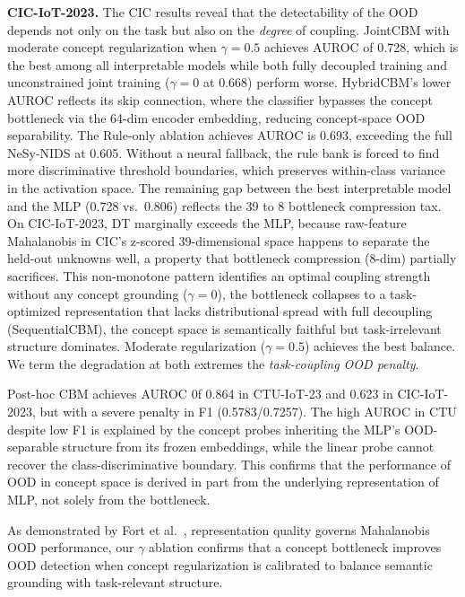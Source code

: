 \documentclass[journal]{IEEEtran}
\begin{document}
\textbf{CIC-IoT-2023.}
The CIC results reveal that the detectability of the OOD depends not only on the task but also on the \emph{degree} of coupling. JointCBM with moderate concept regularization when $\gamma{=}0.5$ achieves AUROC of 0.728, which is the best among all interpretable models while both fully decoupled training and unconstrained joint training ($\gamma{=}0$ at 0.668) perform worse.  HybridCBM's lower AUROC  reflects its skip connection, where the classifier bypasses the concept bottleneck via the 64-dim encoder embedding, reducing concept-space OOD separability. The Rule-only ablation achieves AUROC is 0.693, exceeding the full NeSy-NIDS at 0.605. Without a neural fallback, the rule bank is forced to find more discriminative threshold boundaries, which preserves within-class variance in the activation space. The remaining gap between the best interpretable model and the MLP (0.728 vs.\ 0.806) reflects the 39 to 8 bottleneck compression tax. On CIC-IoT-2023, DT marginally exceeds the MLP, because raw-feature Mahalanobis in CIC's z-scored 39-dimensional space happens to separate the held-out unknowns well, a property that bottleneck compression (8-dim) partially sacrifices. This non-monotone pattern identifies an optimal coupling strength without any concept grounding ($\gamma{=}0$), the bottleneck collapses to a task-optimized representation that lacks distributional spread with full decoupling (SequentialCBM), the concept space is semantically faithful but task-irrelevant structure dominates. Moderate
regularization ($\gamma{=}0.5$) achieves the best balance. We term the degradation at both extremes the \emph{task-coupling OOD penalty}.

Post-hoc CBM achieves AUROC 0f 0.864 in CTU-IoT-23 and 0.623 in CIC-IoT-2023, but with a severe penalty in F1 (0.5783/0.7257). The high AUROC in CTU despite low F1 is explained by the concept probes inheriting the MLP's OOD-separable structure from its frozen embeddings, while the linear probe cannot recover the class-discriminative boundary. This confirms that the performance of OOD in concept space is derived in part from the underlying representation of MLP, not solely from the bottleneck.

As demonstrated by Fort et al.~\cite{fort2021exploring}, representation quality governs Mahalanobis OOD performance, our $\gamma$ ablation confirms that a concept bottleneck improves OOD detection when concept regularization is calibrated to balance semantic grounding with task-relevant structure.
\end{document}

